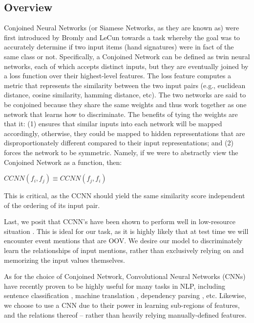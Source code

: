\documentclass[11pt,a4paper]{article}
\begin{document}
\subsection{Overview}
Conjoined Neural Networks (or Siamese Networks, as they are known as) were first introduced by Bromly and LeCun  towards a task whereby the goal was to accurately determine if two input items (hand signatures) were in fact of the same class or not.  Specifically, a Conjoined Network can be defined as twin neural networks, each of which accepts distinct inputs, but they are eventually joined by a loss function over their highest-level features.  The loss feature computes a metric that represents the similarity between the two input pairs (e.g., euclidean distance, cosine similarity, hamming distance, etc).  The two networks are said to be conjoined because they share the same weights and thus work together as one network that learns how to discriminate.  The benefits of tying the weights are that it: (1) ensures that similar inputs into each network will be mapped accordingly, otherwise, they could be mapped to hidden representations that are disproportionately different compared to their input representations; and (2) forces the network to be symmetric.  Namely, if we were to abstractly view the Conjoined Network as a function, then:

\vspace{4mm}

 $CCNN(f_i,f_j) \equiv CCNN(f_j,f_i)$

\vspace{4mm}

This is critical, as the CCNN should yield the same similarity score independent of the ordering of its input pair.

Last, we posit that CCNN's have been shown to perform well in low-resource situation \cite{Koch2015SiameseNN}.  This is ideal for our task, as it is highly likely that at test time we will encounter event mentions that are OOV.  We desire our model to discriminately learn the relationships of input mentions, rather than exclusively relying on and memorizing the input values themselves.

As for the choice of Conjoined Network, Convolutional Neural Networks (CNNs) have recently proven to be highly useful for many tasks in NLP, including sentence classification \cite{DBLP:conf/emnlp/Kim14}, machine translation \cite{DBLP:conf/acl/GehringAGD17}, dependency parsing \cite{DBLP:journals/corr/YuV17}, etc.  Likewise, we choose to use a CNN due to their power in learning sub-regions of features, and the relations thereof -- rather than heavily relying manually-defined features.
\end{document}
